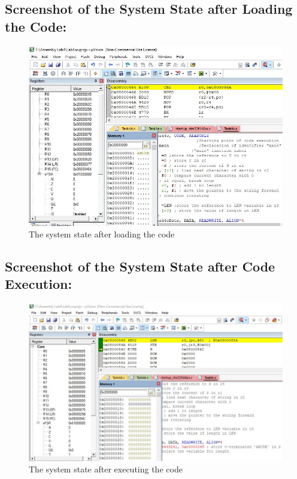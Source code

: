 \documentclass[12pt]{article}
\begin{document}
\subsection{Screenshot of the System State after Loading the Code:}
\begin{figure}[ht]
     \centering
     \includegraphics[scale=.7]{images/beforetask4c.JPG}
     \caption{The system state after loading the code}
     \label{fig:before_task_four_c}
 \end{figure}
 \pagebreak
 \subsection{Screenshot of the System State after Code Execution:}
 \begin{figure}[ht]
     \centering
     \includegraphics[scale=.7]{images/aftertask4c.JPG}
     \caption{The system state after executing the code}
     \label{fig:after_task_four_c}
 \end{figure}
 \pagebreak
\end{document}
